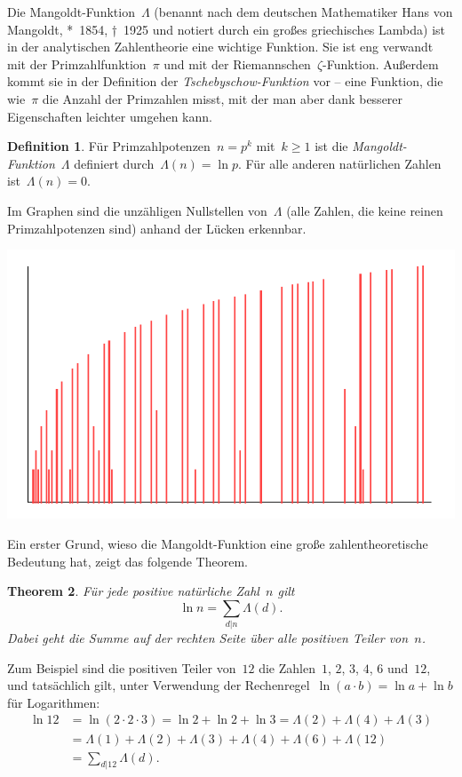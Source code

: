 \documentclass[twoside]{../zirkelblatt1415}
\theoremstyle{definition}
\newtheorem{defn}{Definition}[section]
\theoremstyle{plain}
\newtheorem{thm}[defn]{Theorem}
\theoremstyle{remark}
\begin{document}
Die Mangoldt-Funktion~$\Lambda$ (benannt nach dem deutschen Mathematiker Hans
von Mangoldt, *~1854, †~1925 und notiert durch ein großes griechisches Lambda)
ist in der analytischen Zahlentheorie eine wichtige Funktion. Sie ist eng
verwandt mit der Primzahlfunktion~$\pi$ und mit der
Riemannschen~$\zeta$-Funktion. Außerdem kommt sie in der Definition der
\emph{Tschebyschow-Funktion} vor -- eine Funktion, die wie~$\pi$ die Anzahl der
Primzahlen misst, mit der man aber dank besserer Eigenschaften leichter umgehen
kann.

\begin{defn}Für Primzahlpotenzen~$n = p^k$ mit~$k \geq 1$ ist die
\emph{Mangoldt-Funktion}~$\Lambda$ definiert durch~$\Lambda(n) = \ln p$. Für
alle anderen natürlichen Zahlen ist~$\Lambda(n) = 0$.\end{defn}

Im Graphen sind die unzähligen Nullstellen von~$\Lambda$ (alle Zahlen, die
keine reinen Primzahlpotenzen sind) anhand der Lücken erkennbar.

\begin{center}
  \includegraphics{mangoldt-function}
\end{center}

Ein erster Grund, wieso die Mangoldt-Funktion eine große zahlentheoretische
Bedeutung hat, zeigt das folgende Theorem.

\begin{thm}\label{thm:mangoldt-hauptsatz}Für jede positive natürliche Zahl~$n$
gilt
\[ \ln n = \sum_{d|n} \Lambda(d). \]
Dabei geht die Summe auf der rechten Seite über alle positiven Teiler von~$n$.
\end{thm}

Zum Beispiel sind die positiven Teiler von~$12$ die Zahlen~$1$, $2$, $3$, $4$,
$6$ und~$12$, und tatsächlich gilt, unter Verwendung der Rechenregel~$\ln(a
\cdot b) = \ln a + \ln b$ für Logarithmen:
\begin{align*}
  \ln 12 &= \ln(2 \cdot 2 \cdot 3) =
  \ln 2 + \ln 2 + \ln 3 =
  \Lambda(2) + \Lambda(4) + \Lambda(3) \\
  &= \Lambda(1) + \Lambda(2) + \Lambda(3) + \Lambda(4) + \Lambda(6) +
  \Lambda(12) \\
  &= \sum_{d|12} \Lambda(d).
\end{align*}
\end{document}
